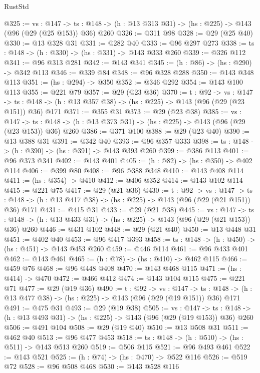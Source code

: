 \begin{lexlean}{RustStd}
\begin{coremodule}
{\begin{coremodule}
{{{{{@325 := {vs : @147} ->
  {ts : @148} -> (h : @13 @313 @31) -> (hs : @225) -> @143 (@96 (@29 (@25 @153)) @36) @260
@326 := @311 @98
@328 := @29 (@25 @40)
@330 := @13 @328 @31
@331 := @282 @40
@333 := @96 @297 @273
@338 := {ts : @148} -> (h : @330) -> (hs : @331) -> @143 @333 @260
@339 := @326 @112
@341 := @96 @313 @281
@342 := @143 @341
@345 := (h : @86) -> (hs : @290) -> @342 @113
@346 := @339 @84
@348 := @96 @328 @288
@350 := @143 @348 @113
@351 := (hs : @294) -> @350
@352 := @346 @292
@354 := @143 @100 @113
@355 := @221 @79
@357 := @29 (@23 @36)
@370 := {t : @92} ->
  {vs : @147} ->
  {ts : @148} -> (h : @13 @357 @38) -> (hs : @225) -> @143 (@96 (@29 (@23 @151)) @36) @171
@371 := @355 @31
@373 := @29 (@23 @38)
@385 := {vs : @147} ->
  {ts : @148} -> (h : @13 @373 @31) -> (hs : @225) -> @143 (@96 (@29 (@23 @153)) @36) @260
@386 := @371 @100
@388 := @29 (@23 @40)
@390 := @13 @388 @31
@391 := @342 @40
@393 := @96 @357 @333
@398 := {ts : @148} -> (h : @390) -> (hs : @391) -> @143 @393 @260
@399 := @386 @113
@401 := @96 @373 @341
@402 := @143 @401
@405 := (h : @82) -> (hs : @350) -> @402 @114
@406 := @399 @80
@408 := @96 @388 @348
@410 := @143 @408 @114
@411 := (hs : @354) -> @410
@412 := @406 @352
@414 := @143 @102 @114
@415 := @221 @75
@417 := @29 (@21 @36)
@430 := {t : @92} ->
  {vs : @147} ->
  {ts : @148} -> (h : @13 @417 @38) -> (hs : @225) -> @143 (@96 (@29 (@21 @151)) @36) @171
@431 := @415 @31
@433 := @29 (@21 @38)
@445 := {vs : @147} ->
  {ts : @148} -> (h : @13 @433 @31) -> (hs : @225) -> @143 (@96 (@29 (@21 @153)) @36) @260
@446 := @431 @102
@448 := @29 (@21 @40)
@450 := @13 @448 @31
@451 := @402 @40
@453 := @96 @417 @393
@458 := {ts : @148} -> (h : @450) -> (hs : @451) -> @143 @453 @260
@459 := @446 @114
@461 := @96 @433 @401
@462 := @143 @461
@465 := (h : @78) -> (hs : @410) -> @462 @115
@466 := @459 @76
@468 := @96 @448 @408
@470 := @143 @468 @115
@471 := (hs : @414) -> @470
@472 := @466 @412
@474 := @143 @104 @115
@475 := @221 @71
@477 := @29 (@19 @36)
@490 := {t : @92} ->
  {vs : @147} ->
  {ts : @148} -> (h : @13 @477 @38) -> (hs : @225) -> @143 (@96 (@29 (@19 @151)) @36) @171
@491 := @475 @31
@493 := @29 (@19 @38)
@505 := {vs : @147} ->
  {ts : @148} -> (h : @13 @493 @31) -> (hs : @225) -> @143 (@96 (@29 (@19 @153)) @36) @260
@506 := @491 @104
@508 := @29 (@19 @40)
@510 := @13 @508 @31
@511 := @462 @40
@513 := @96 @477 @453
@518 := {ts : @148} -> (h : @510) -> (hs : @511) -> @143 @513 @260
@519 := @506 @115
@521 := @96 @493 @461
@522 := @143 @521
@525 := (h : @74) -> (hs : @470) -> @522 @116
@526 := @519 @72
@528 := @96 @508 @468
@530 := @143 @528 @116
}}}}}
\end{coremodule}}
\end{coremodule}
\end{lexlean}
